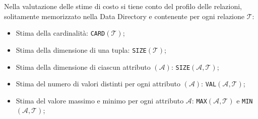 \documentclass[oneside,a4paper,11pt]{book}
\theoremstyle{italicstyle}
\theoremstyle{normStyle}
\begin{document}
Nella valutazione delle stime di costo si tiene conto del profilo delle relazioni, solitamente 
memorizzato nella Data Directory e contenente per ogni relazione $\mathcal{T}$:
\begin{itemize}
  \item Stima della cardinalità: \verb|CARD|$(\mathcal{T})$;
  \item Stima della dimensione di una tupla: \verb|SIZE|$(\mathcal{T})$;
  \item Stima della dimensione di ciascun attributo $(\mathcal{A})$: \verb|SIZE|$(\mathcal{A},\mathcal{T})$;
  \item Stima del numero di valori distinti per ogni attributo $(\mathcal{A})$: \verb|VAL|$(\mathcal{A},\mathcal{T})$;
  \item Stima del valore massimo e minimo per ogni attributo $\mathcal{A}$:
  \verb|MAX|$(\mathcal{A},\mathcal{T})$ e \verb|MIN|$(\mathcal{A},\mathcal{T})$;
\end{itemize}
\end{document}
